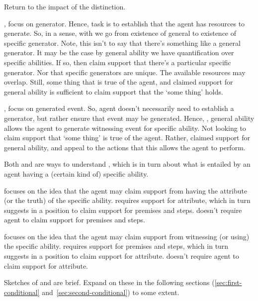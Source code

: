 \begin{note}
  Return to the impact of the distinction.

  \AR{}, focus on generator.
  Hence, task is to establish that the agent has resources to generate.
  So, in a sense, with \gsi{} we go from existence of general to existence of specific generator.
  Note, this isn't to say that there's something like a general generator.
  It may be the case by general ability we have quantification over specific abilities.
  If so, then claim support that there's a particular specific generator.
  Nor that specific generators are unique.
  The available resources may overlap.
  Still, some thing that is true of the agent, and claimed support for general ability is sufficient to claim support that the `some thing' holds.

  \WR{}, focus on generated event.
  So, agent doesn't necessarily need to establish a generator, but rather ensure that event may be generated.
  Hence, \gsi{}, general ability allows the agent to generate witnessing event for specific ability.
  Not looking to claim support that `some thing' is true of the agent.
  Rather, claimed support for general ability, and appeal to the actions that this allows the agent to perform.
\end{note}

\begin{note}
  Both \AR{} and \WR{} are ways to understand , which is in turn about what is entailed by an agent having a (certain kind of) specific ability.

  \AR{} focuses on the idea that the agent may claim support from having the attribute (or the truth) of the specific ability.
  \AR{} requires support for attribute, which in turn suggests in a position to claim support for premises and steps.
  \AR{} doesn't require agent to claim support for premises and steps.

  \WR{} focuses on the idea that the agent may claim support from witnessing (or using) the specific ability.
  \WR{} requires support for premises and steps, which in turn suggests in a position to claim support for attribute.
  \WR{} doesn't require agent to claim support for attribute.
\end{note}

\begin{note}
  Sketches of \AR{} and \WR{} are brief.
  Expand on these in the following sections (\ref{sec:first-conditional} and~\ref{sec:second-conditional}) to some extent.
\end{note}

